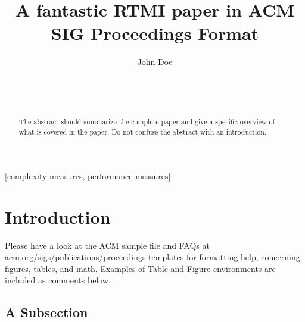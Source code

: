 \documentclass{acm_proc_article-sp}
\begin{document}

\title{A fantastic RTMI paper in ACM SIG Proceedings Format}

\author{
\alignauthor
John Doe\\
       \\
       \\
       \\
}

\maketitle
\begin{abstract}
The abstract should summarize the complete paper and give a specific overview of what is covered in the paper. Do not confuse the abstract with an introduction.
\end{abstract}

[complexity measures, performance measures]


\section{Introduction}
Please have a look at the ACM sample file and FAQs at \url{acm.org/sigs/publications/proceedings-templates} for formatting help, concerning figures, tables, and math. Examples of Table and Figure environments are included as comments below.

\subsection{A Subsection}
\end{document}
